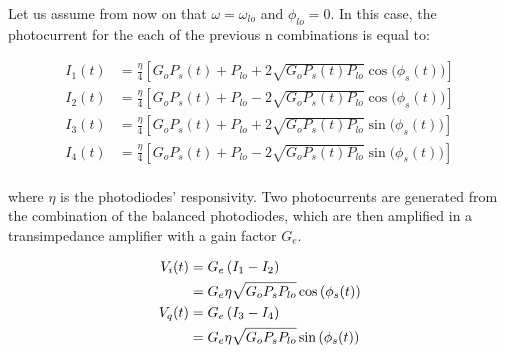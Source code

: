 	Let us assume from now on that $\omega = \omega_{lo}$ and $\phi_{lo} = 0$. In
	this case, the photocurrent for the each of the previous n combinations is
	equal to:


	\begin{align}
		I_1 (t) &= \frac{\eta}{4} \left[ G_o P_s(t) + P_{lo} + 2 \sqrt{G_o P_s(t)P_{lo}}
						\cos{\big(\phi_s(t)\big)}\right] \\
		I_2 (t) &= \frac{\eta}{4} \left[ G_o P_s(t) + P_{lo} - 2 \sqrt{G_o P_s(t)P_{lo}}
						\cos{\big(\phi_s(t)\big)}\right] \\
		I_3 (t) &= \frac{\eta}{4} \left[ G_o P_s(t) + P_{lo} + 2 \sqrt{G_o P_s(t)P_{lo}}
						\sin{\big(\phi_s(t)\big)}\right] \\
		I_4 (t) &= \frac{\eta}{4} \left[ G_o P_s(t) + P_{lo} - 2 \sqrt{G_o P_s(t)P_{lo}}
						\sin{\big(\phi_s(t)\big)}\right] \\
	\end{align}

	\noindent where $\eta$ is the photodiodes' responsivity.
	Two photocurrents are generated from the combination of the balanced photodiodes,
	which are then amplified in a transimpedance amplifier with a gain factor $G_e$.

	\begin{align}
		V_i(t) &= G_e\left(I_{1} - I_{2}\right) \notag\\
					 &= G_e \eta \sqrt{G_o P_s P_{lo}} \cos{(\phi_{s}(t))} \label{eq:photocurrentI} \\
		V_q(t) &= G_e\left(I_{3} - I_{4}\right) \notag\\
					 &= G_e \eta \sqrt{G_o P_s P_{lo}} \sin{(\phi_{s}(t))}\label{eq:photocurrentQ}
	\end{align}


